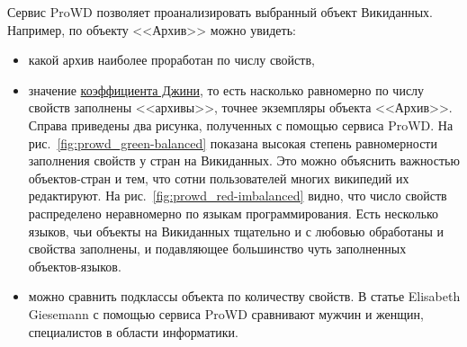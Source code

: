 Сервис ProWD позволяет проанализировать выбранный объект Викиданных. 
Например, по объекту <<Архив>> можно увидеть: 
\begin{itemize}
    \item какой архив наиболее проработан по числу свойств,

    \item значение \href{https://w.wiki/gg7}{коэффициента Джини}, то есть насколько равномерно по числу свойств заполнены <<архивы>>, точнее экземпляры объекта <<Архив>>. Справа приведены два рисунка, 
        полученных с помощью сервиса ProWD. 
        На рис.~\ref{fig:prowd_green-balanced} показана высокая степень 
        равномерности заполнения свойств у стран на Викиданных. 
        Это можно объяснить важностью объектов-стран и тем, что 
        сотни пользователей многих википедий их редактируют.
        На рис.~\ref{fig:prowd_red-imbalanced} видно, что число свойств 
        распределено неравномерно по языкам программирования. Есть несколько 
        языков, чьи объекты на Викиданных тщательно и с любовью обработаны и свойства заполнены, 
        и подавляющее большинство чуть заполненных объектов-языков.

    \item можно сравнить подклассы объекта по количеству свойств. В статье Elisabeth Giesemann\cite{Giesemann2020}
        с помощью сервиса ProWD сравнивают мужчин и женщин, специалистов в области информатики.
\end{itemize}



